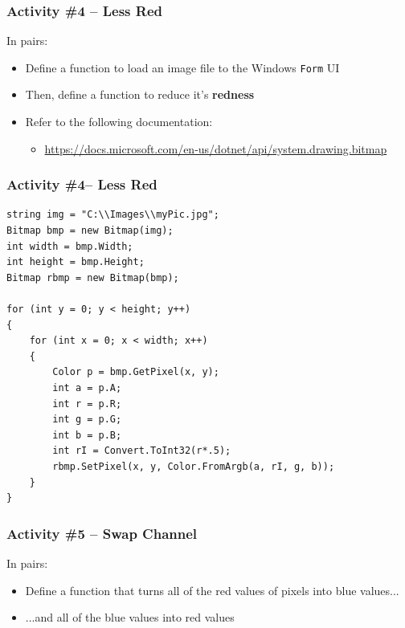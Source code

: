 \begin{frame}
	\frametitle{Activity \#4 -- Less Red}
	
	In pairs:
	
	\vspace{2em}
	
	\begin{itemize}		
		\item Define a function to load an image file to the Windows \texttt{Form} UI
		\item Then, define a function to reduce it's \textbf{redness}
		\item Refer to the following documentation:
		\begin{itemize}
			\item \url{https://docs.microsoft.com/en-us/dotnet/api/system.drawing.bitmap}
		\end{itemize}
	\end{itemize}
\end{frame}

\begin{frame}[fragile]
	\frametitle{Activity \#4-- Less Red}

\begin{lstlisting}
string img = "C:\\Images\\myPic.jpg";
Bitmap bmp = new Bitmap(img);
int width = bmp.Width;
int height = bmp.Height;
Bitmap rbmp = new Bitmap(bmp);

for (int y = 0; y < height; y++)
{
	for (int x = 0; x < width; x++)
	{
		Color p = bmp.GetPixel(x, y);
		int a = p.A;
		int r = p.R;
		int g = p.G;
		int b = p.B;
		int rI = Convert.ToInt32(r*.5);	
		rbmp.SetPixel(x, y, Color.FromArgb(a, rI, g, b));
	}
}
\end{lstlisting}

\end{frame}

\begin{frame}
	\frametitle{Activity \#5 -- Swap Channel}
	
	In pairs:
	
	\vspace{2em}
	
	\begin{itemize}
		\item Define a function that turns all of the red values of pixels into blue values...
		\item ...and all of the blue values into red values
	\end{itemize}
\end{frame}

